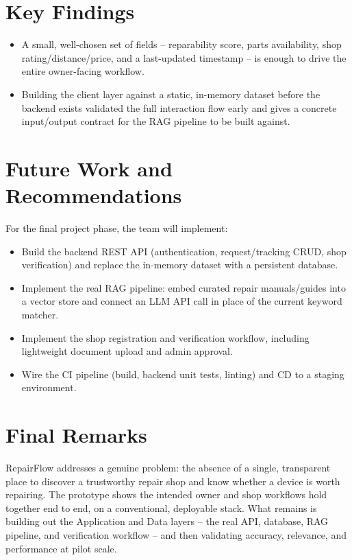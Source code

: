 \documentclass[11pt,a4paper]{report}
\begin{document}
\section{Key Findings}

\begin{itemize}
    \item A small, well-chosen set of fields -- reparability score, parts availability, shop rating/distance/price, and a last-updated timestamp -- is enough to drive the entire owner-facing workflow.
    \item Building the client layer against a static, in-memory dataset before the backend exists validated the full interaction flow early and gives a concrete input/output contract for the RAG pipeline to be built against.
\end{itemize}

\section{Future Work and Recommendations}

For the final project phase, the team will implement:

\begin{itemize}
    \item Build the backend REST API (authentication, request/tracking CRUD, shop verification) and replace the in-memory dataset with a persistent database.
    \item Implement the real RAG pipeline: embed curated repair manuals/guides into a vector store and connect an LLM API call in place of the current keyword matcher.
    \item Implement the shop registration and verification workflow, including lightweight document upload and admin approval.
    \item Wire the CI pipeline (build, backend unit tests, linting) and CD to a staging environment.
\end{itemize}

\section{Final Remarks}

RepairFlow addresses a genuine problem: the absence of a single, transparent place to discover a trustworthy repair shop and know whether a device is worth repairing. The prototype shows the intended owner and shop workflows hold together end to end, on a conventional, deployable stack. What remains is building out the Application and Data layers -- the real API, database, RAG pipeline, and verification workflow -- and then validating accuracy, relevance, and performance at pilot scale.
\end{document}
